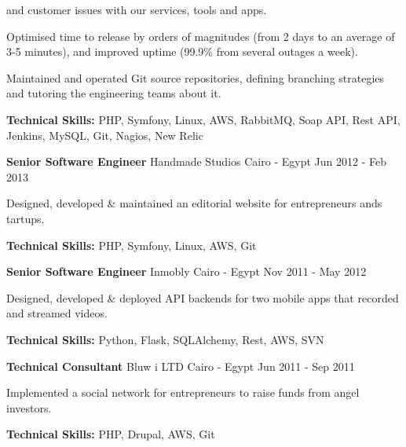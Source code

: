 \begin{cventries}
{\begin{cvitems}
{			            and customer issues with our services, tools and apps.}
			\item {Optimised time to release by orders of magnitudes (from 2 days to an average of 3-5
			            minutes), and improved uptime (99.9\% from several outages a week).}
			\item {Maintained and operated Git source repositories, defining branching strategies and
			            tutoring the engineering teams about it.}
			\item {\textbf{Technical Skills:} PHP, Symfony, Linux, AWS, RabbitMQ, Soap API, Rest API,
			            Jenkins, MySQL, Git, Nagios, New Relic}
		\end{cvitems}
	}

	\cventry
	{\textbf{Senior Software Engineer}} %
	{Handmade Studios} %
	{Cairo - Egypt} %
	{Jun 2012 - Feb 2013} %
	{
		\begin{cvitems} %
			\item {Designed, developed \& maintained an editorial website for entrepreneurs ands
			            tartups.}
			\item {\textbf{Technical Skills:} PHP, Symfony, Linux, AWS, Git}
		\end{cvitems}
	}


	\cventry
	{\textbf{Senior Software Engineer}} %
	{Inmobly} %
	{Cairo - Egypt} %
	{Nov 2011 - May 2012} %
	{
		\begin{cvitems} %
			\item {Designed, developed \& deployed API backends for two mobile apps that recorded and streamed videos.}
			\item {\textbf{Technical Skills:} Python, Flask, SQLAlchemy, Rest, AWS, SVN}
		\end{cvitems}
	}

	\cventry
	{\textbf{Technical Consultant}} %
	{Bluw i LTD} %
	{Cairo - Egypt} %
	{Jun 2011 - Sep 2011} %
	{
		\begin{cvitems} %
			\item {Implemented a social network for entrepreneurs to raise funds from angel investors.}
			\item {\textbf{Technical Skills:} PHP, Drupal, AWS, Git}
		\end{cvitems}
	}


\end{cventries}
